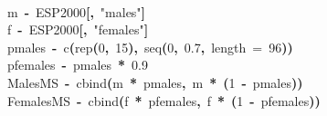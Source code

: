 \documentclass[a4paper]{article}
\newcommand{\hlnumber}[1]{\textcolor[rgb]{0.0823529411764706,0.0784313725490196,0.709803921568627}{#1}}%
\newcommand{\hlfunctioncall}[1]{\textcolor[rgb]{1,0,0}{#1}}%
\newcommand{\hlstring}[1]{\textcolor[rgb]{0.6,0.6,1}{#1}}%
\newcommand{\hlkeyword}[1]{\textcolor[rgb]{0,0,0}{\textbf{#1}}}%
\newcommand{\hlargument}[1]{\textcolor[rgb]{0.694117647058824,0.247058823529412,0.0196078431372549}{#1}}%
\newcommand{\hlassignement}[1]{\textcolor[rgb]{0.215686274509804,0.215686274509804,0.384313725490196}{\textbf{#1}}}%
\newcommand{\hlsymbol}[1]{\textcolor[rgb]{0,0,0}{#1}}%
\newcommand{\hlprompt}[1]{\textcolor[rgb]{0,0,0}{#1}}%
\newcommand{\hlstd}[1]{\textcolor[rgb]{0,0,0}{#1}}%
\newenvironment{Houtput}{\raggedright}{%
%
}
\begin{document}
\begin{Houtput}
\hspace*{\fill}\\
\hlstd{}\ttfamily\noindent
\hlprompt{\usebox{\hlnormalsizeboxgreaterthan}{\ }}\hlsymbol{m}{\ }\hlassignement{\usebox{\hlnormalsizeboxlessthan}-}{\ }\hlsymbol{ESP2000}\hlkeyword{[}\hlkeyword{,}{\ }\hlstring{"males"}\hlkeyword{]}\mbox{}
\normalfont
\hspace*{\fill}\\
\hlstd{}\ttfamily\noindent
\hlprompt{\usebox{\hlnormalsizeboxgreaterthan}{\ }}\hlsymbol{f}{\ }\hlassignement{\usebox{\hlnormalsizeboxlessthan}-}{\ }\hlsymbol{ESP2000}\hlkeyword{[}\hlkeyword{,}{\ }\hlstring{"females"}\hlkeyword{]}\mbox{}
\normalfont
\hspace*{\fill}\\
\hlstd{}\ttfamily\noindent
\hlprompt{\usebox{\hlnormalsizeboxgreaterthan}{\ }}\hlsymbol{pmales}{\ }\hlassignement{\usebox{\hlnormalsizeboxlessthan}-}{\ }\hlfunctioncall{c}\hlkeyword{(}\hlfunctioncall{rep}\hlkeyword{(}\hlnumber{0}\hlkeyword{,}{\ }\hlnumber{15}\hlkeyword{)}\hlkeyword{,}{\ }\hlfunctioncall{seq}\hlkeyword{(}\hlnumber{0}\hlkeyword{,}{\ }\hlnumber{0.7}\hlkeyword{,}{\ }\hlargument{length}{\ }\hlargument{=}{\ }\hlnumber{96}\hlkeyword{)}\hlkeyword{)}\mbox{}
\normalfont
\hspace*{\fill}\\
\hlstd{}\ttfamily\noindent
\hlprompt{\usebox{\hlnormalsizeboxgreaterthan}{\ }}\hlsymbol{pfemales}{\ }\hlassignement{\usebox{\hlnormalsizeboxlessthan}-}{\ }\hlsymbol{pmales}{\ }\hlkeyword{*}{\ }\hlnumber{0.9}\mbox{}
\normalfont
\hspace*{\fill}\\
\hlstd{}\ttfamily\noindent
\hlprompt{\usebox{\hlnormalsizeboxgreaterthan}{\ }}\hlsymbol{MalesMS}{\ }\hlassignement{\usebox{\hlnormalsizeboxlessthan}-}{\ }\hlfunctioncall{cbind}\hlkeyword{(}\hlsymbol{m}{\ }\hlkeyword{*}{\ }\hlsymbol{pmales}\hlkeyword{,}{\ }\hlsymbol{m}{\ }\hlkeyword{*}{\ }\hlkeyword{(}\hlnumber{1}{\ }\hlkeyword{-}{\ }\hlsymbol{pmales}\hlkeyword{)}\hlkeyword{)}\mbox{}
\normalfont
\hspace*{\fill}\\
\hlstd{}\ttfamily\noindent
\hlprompt{\usebox{\hlnormalsizeboxgreaterthan}{\ }}\hlsymbol{FemalesMS}{\ }\hlassignement{\usebox{\hlnormalsizeboxlessthan}-}{\ }\hlfunctioncall{cbind}\hlkeyword{(}\hlsymbol{f}{\ }\hlkeyword{*}{\ }\hlsymbol{pfemales}\hlkeyword{,}{\ }\hlsymbol{f}{\ }\hlkeyword{*}{\ }\hlkeyword{(}\hlnumber{1}{\ }\hlkeyword{-}{\ }\hlsymbol{pfemales}\hlkeyword{)}\hlkeyword{)}\mbox{}

\end{Houtput}
\end{document}
